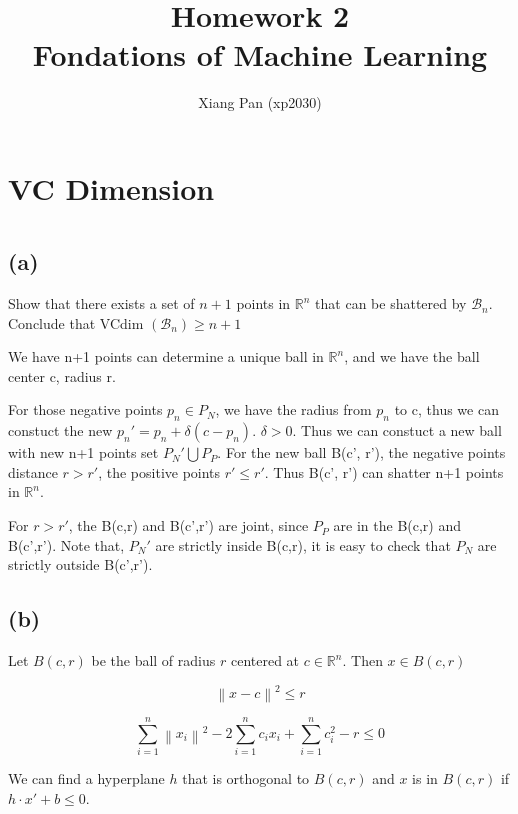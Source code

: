 \documentclass{article}
\title{%
   Homework 2 \\
  \large Fondations of Machine Learning \\}
\author{Xiang Pan (xp2030)}
\begin{document}
\maketitle
\section*{VC Dimension}
\section{}
\subsection*{(a)}
Show that there exists a set of $n+1$ points in $\mathbb{R}^{n}$ that can be shattered by $\mathcal{B}_{n}$. Conclude that VCdim $\left(\mathcal{B}_{n}\right) \geq n+1$


We have n+1 points can determine a unique ball in $\mathbb{R}^{n}$, and we have the ball center c, radius r. 

For those negative points $p_n \in P_{N}$, we have the radius from $p_n$ to c, thus we can constuct the new $p_n' = p_n + \delta(c-p_n)$.
$\delta>0$. Thus we can constuct a new ball with new n+1 points set ${P_N'} \bigcup {P_P}$. For the new ball B(c', r'), the negative points distance $r>r'$, the positive points $r'\leq r'$. Thus B(c', r') can shatter n+1 points in $\mathbb{R}^{n}$.

For $r > r'$, the B(c,r) and B(c',r') are joint, since $P_P$ are in the B(c,r) and B(c',r'). Note that, $P_N'$ are strictly inside B(c,r), it is easy to check that $P_N$ are strictly outside B(c',r'). 

\subsection*{(b)}

Let $B(c, r)$ be the ball of radius $r$ centered at $c \in \mathbb{R}^{n}$. Then $x \in B(c, r)$ 

\begin{equation}
\left\| x - c \right\|^2 \leq r
\end{equation}


\begin{equation}
\sum_{i=1}^{n}\left\|x_{i}\right\|^{2}-2 \sum_{i=1}^{n} c_{i} x_{i}+\sum_{i=1}^{n} c_{i}^{2}-r \leq 0
\end{equation}

We can find a hyperplane $h$ that is orthogonal to $B(c, r)$ and $x$ is in $B(c, r)$ if $h \cdot x' + b \leq 0$.
\end{document}
